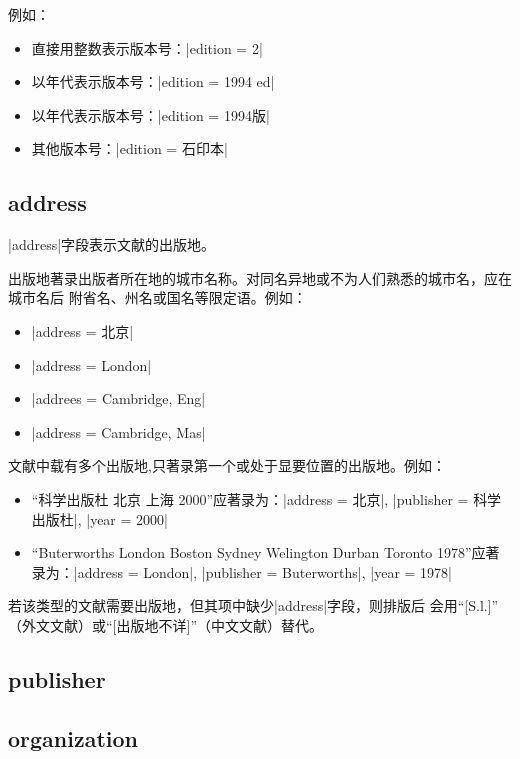 例如：
\begin{itemize}
\item 直接用整数表示版本号：|edition = {2}|
\item 以年代表示版本号：|edition = {1994 ed}|
\item 以年代表示版本号：|edition = {1994版}|
\item 其他版本号：|edition = {石印本}|
\end{itemize}

\subsection{address}\label{subsec:bibfield-address}

|address|字段表示文献的出版地。

出版地著录出版者所在地的城市名称。对同名异地或不为人们熟悉的城市名，应在城市名后
附省名、州名或国名等限定语。例如：
\begin{itemize}
\item |address = {北京}|
\item |address = {London}|
\item |addrees = {Cambridge, Eng}|
\item |address = {Cambridge, Mas}|
\end{itemize}

文献中载有多个出版地,只著录第一个或处于显要位置的出版地。例如：
\begin{itemize}
\item ``科学出版杜 北京 上海 2000''应著录为：|address = {北京}|, |publisher =
  {科学出版杜}|, |year = {2000}|
\item ``Buterworths London Boston Sydney Welington Durban Toronto 1978''应著
  录为：|address = {London}|, |publisher = {Buterworths}|, |year = {1978}|
\end{itemize}

若该类型的文献需要出版地，但其{\BibTeX}项中缺少|address|字段，则{\BibTeX}排版后
会用``[S.l.]'' （外文文献）或``[出版地不详]''（中文文献）替代。

\subsection{publisher}\label{subsec:bibfield-publisher}

\subsection{organization}\label{subsec:bibfield-organization}

